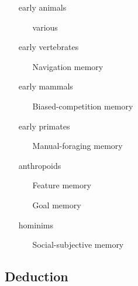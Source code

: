 \documentclass[10pt,titlepage]{book}
\begin{document}
\begin{itemize}
\item[early animals]
  
  \begin{itemize}
\item[]
\item[various]
  \end{itemize}

\item[early vertebrates]
  
  \begin{itemize}
\item[]
\item[Navigation memory]
  \end{itemize}
 
\item[early mammals]
  
  \begin{itemize}
\item[]
\item[Biased-competition memory]
  \end{itemize}
 
\item[early primates]
  
  \begin{itemize}
\item[]
\item[Manual-foraging memory]
  \end{itemize}
 
\item[anthropoids]
  
  \begin{itemize}
\item[]
\item[Feature memory]
\item[Goal memory]
  \end{itemize}
  
\item[hominims]
  
  \begin{itemize}
\item[]
\item[Social-subjective memory]
  \end{itemize}
  \end{itemize}

\subsection{Deduction}
\end{document}
